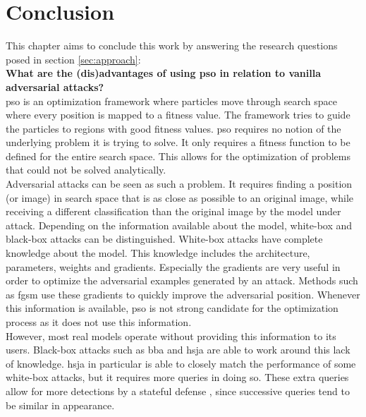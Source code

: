 \chapter{Conclusion}\label{chap:conclusion}
This chapter aims to conclude this work by answering the research questions posed in section \ref{sec:approach}:\\

\textbf{What are the (dis)advantages of using \gls{pso} in relation to vanilla adversarial attacks?}\\
\gls{pso} is an optimization framework where particles move through search space where every position is mapped to a fitness value. The framework tries to guide the particles to regions with good fitness values. \gls{pso} requires no notion of the underlying problem it is trying to solve. It only requires a fitness function to be defined for the entire search space. This allows for the optimization of problems that could not be solved analytically.\\

Adversarial attacks can be seen as such a problem. It requires finding a position (or image) in search space that is as close as possible to an original image, while receiving a different classification than the original image by the model under attack. Depending on the information available about the model, white-box and black-box attacks can be distinguished. White-box attacks have complete knowledge about the model. This knowledge includes the architecture, parameters, weights and gradients. Especially the gradients are very useful in order to optimize the adversarial examples generated by an attack. Methods such as \gls{fgsm} \cite{FGSM} use these gradients to quickly improve the adversarial position. Whenever this information is available, \gls{pso} is not strong candidate for the optimization process as it does not use this information.\\

However, most real models operate without providing this information to its users. Black-box attacks such as \gls{bba} \cite{brunner_guessing_2019} and \gls{hsja} \cite{hsja} are able to work around this lack of knowledge. \gls{hsja} in particular is able to closely match the performance of some white-box attacks, but it requires more queries in doing so. These extra queries allow for more detections by a stateful defense \cite{chen_stateful_2019}, since successive queries tend to be similar in appearance.\\

